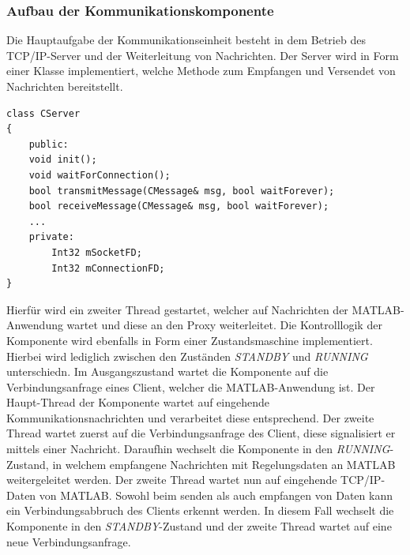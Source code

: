 \subsubsection{Aufbau der Kommunikationskomponente}
Die Hauptaufgabe der Kommunikationseinheit besteht in dem Betrieb des TCP/IP-Server und der Weiterleitung von Nachrichten. Der Server wird in Form einer Klasse implementiert, welche Methode zum Empfangen und Versendet von Nachrichten bereitstellt. 

\begin{lstlisting}
class CServer
{
	public:
	void init();
	void waitForConnection();
	bool transmitMessage(CMessage& msg, bool waitForever);
	bool receiveMessage(CMessage& msg, bool waitForever);
	...
	private:
		Int32 mSocketFD;
		Int32 mConnectionFD;
}
\end{lstlisting}

Hierfür wird ein zweiter Thread gestartet, welcher auf Nachrichten der MATLAB-Anwendung wartet und diese an den Proxy weiterleitet. Die Kontrolllogik der Komponente wird ebenfalls in Form einer Zustandsmaschine implementiert. Hierbei wird lediglich zwischen den Zuständen \textit{STANDBY} und \textit{RUNNING} unterschiedn. Im Ausgangszustand wartet die Komponente auf die Verbindungsanfrage eines Client, welcher die MATLAB-Anwendung ist. Der Haupt-Thread der Komponente wartet auf eingehende Kommunikationsnachrichten und verarbeitet diese entsprechend. Der zweite Thread wartet zuerst auf die Verbindungsanfrage des Client, diese signalisiert er mittels einer Nachricht. Daraufhin wechselt die Komponente in den \textit{RUNNING}-Zustand, in welchem empfangene Nachrichten mit Regelungsdaten an MATLAB weitergeleitet werden. Der zweite Thread wartet nun auf eingehende TCP/IP-Daten von MATLAB. Sowohl beim senden als auch empfangen von Daten kann ein Verbindungsabbruch des Clients erkennt werden. In diesem Fall wechselt die Komponente in den \textit{STANDBY}-Zustand und der zweite Thread wartet auf eine neue Verbindungsanfrage.